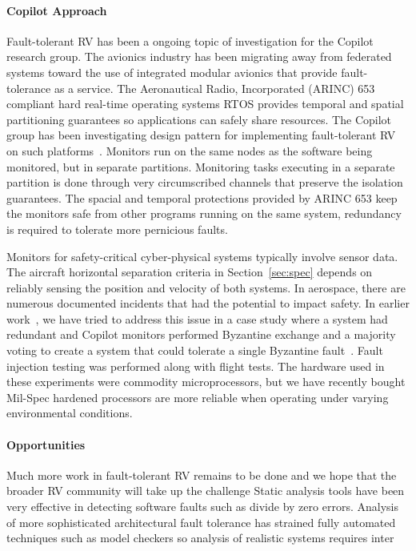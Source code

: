 \paragraph{Copilot Approach} Fault-tolerant RV has been a ongoing
topic of investigation for the Copilot research group. The avionics
industry has been migrating away from federated systems toward the use
of integrated modular avionics that provide fault-tolerance as a
service.  The Aeronautical Radio, Incorporated (ARINC)
653~\cite{ARINC653} compliant hard real-time operating systems RTOS
provides temporal and spatial partitioning guarantees so applications
can safely share resources.  The Copilot group has been investigating
design pattern for implementing fault-tolerant RV on such
platforms~\cite{Kaveh15}. Monitors run on the same nodes as the
software being monitored, but in separate partitions. Monitoring tasks
executing in a separate partition is done through very circumscribed
channels that preserve the isolation guarantees.  The spacial and
temporal protections provided by ARINC 653 keep the monitors safe from
other programs running on the same system, redundancy is required to
tolerate more pernicious faults.


 Monitors for safety-critical cyber-physical systems typically involve
 sensor data. The aircraft horizontal separation criteria in
 Section~\ref{sec:spec} depends on reliably sensing the position and
 velocity of both systems.  In aerospace, there are numerous
 documented incidents that had the potential to impact safety.  In
 earlier work~\cite{pike-isse-13}, we have tried to address this issue
 in a case study where a system had redundant and Copilot monitors
 performed Byzantine exchange and a majority voting to create a system
 that could tolerate a single Byzantine fault~\cite{pike-isse-13}.
 Fault injection testing was performed along with flight tests.  The
 hardware used in these experiments were commodity microprocessors,
 but we have recently bought Mil-Spec hardened processors are more
 reliable when operating under varying environmental conditions.


 \paragraph{Opportunities} Much more work in fault-tolerant RV remains
 to be done and we hope that the broader RV community will take up the
 challenge Static analysis tools have been very effective in detecting
 software faults such as divide by zero errors. Analysis of more
 sophisticated architectural fault tolerance has strained fully
 automated techniques such as model checkers so analysis of realistic
 systems requires inter



